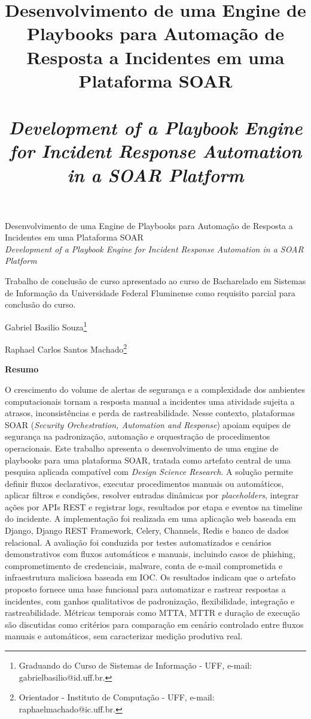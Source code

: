 \documentclass[article,a4paper,12pt,english,brazil,sumario=tradicional]{abntex2}
\title{{\Large Desenvolvimento de uma Engine de Playbooks para Automação de Resposta a Incidentes em uma Plataforma SOAR\\\\
\vspace{.2cm}
\textit{Development of a Playbook Engine for Incident Response Automation in a SOAR Platform}\\}}
\date{ }
\begin{document}
\textual

\begin{center}
{\Large Desenvolvimento de uma Engine de Playbooks para Automação de Resposta a Incidentes em uma Plataforma SOAR\\[.2cm]
\textit{Development of a Playbook Engine for Incident Response Automation in a SOAR Platform}\\}

\vspace{.2cm}
{\small Trabalho de conclusão de curso apresentado ao curso de Bacharelado em Sistemas de Informação da Universidade Federal Fluminense como requisito parcial para conclusão do curso.}
\end{center}
\vspace{.2cm} 

\begin{flushright}
Gabriel Basilio Souza\footnote{Graduando do Curso de Sistemas de Informação - UFF, e-mail: gabrielbasilio@id.uff.br.} 

Raphael Carlos Santos Machado\footnote{Orientador - Instituto de Computação - UFF, e-mail: raphaelmachado@ic.uff.br.}
\end{flushright}

\vspace{\onelineskip}

\begin{center}
    \textbf{Resumo}
\end{center}

\vspace{-.3cm}

\noindent O crescimento do volume de alertas de segurança e a complexidade dos ambientes computacionais tornam a resposta manual a incidentes uma atividade sujeita a atrasos, inconsistências e perda de rastreabilidade. Nesse contexto, plataformas SOAR (\textit{Security Orchestration, Automation and Response}) apoiam equipes de segurança na padronização, automação e orquestração de procedimentos operacionais. Este trabalho apresenta o desenvolvimento de uma engine de playbooks para uma plataforma SOAR, tratada como artefato central de uma pesquisa aplicada compatível com \textit{Design Science Research}. A solução permite definir fluxos declarativos, executar procedimentos manuais ou automáticos, aplicar filtros e condições, resolver entradas dinâmicas por \textit{placeholders}, integrar ações por APIs REST e registrar logs, resultados por etapa e eventos na timeline do incidente. A implementação foi realizada em uma aplicação web baseada em Django, Django REST Framework, Celery, Channels, Redis e banco de dados relacional. A avaliação foi conduzida por testes automatizados e cenários demonstrativos com fluxos automáticos e manuais, incluindo casos de phishing, comprometimento de credenciais, malware, conta de e-mail comprometida e infraestrutura maliciosa baseada em IOC. Os resultados indicam que o artefato proposto fornece uma base funcional para automatizar e rastrear respostas a incidentes, com ganhos qualitativos de padronização, flexibilidade, integração e rastreabilidade. Métricas temporais como MTTA, MTTR e duração de execução são discutidas como critérios para comparação em cenário controlado entre fluxos manuais e automáticos, sem caracterizar medição produtiva real.
\end{document}
